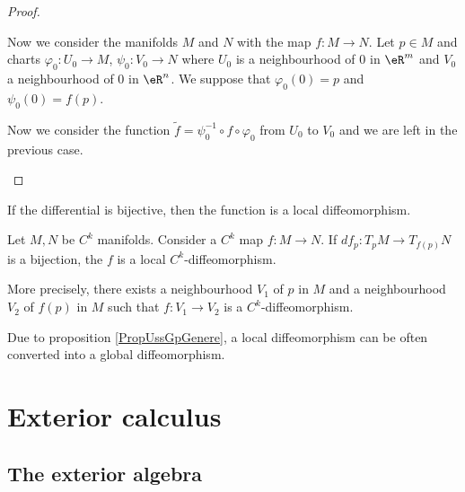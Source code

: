 \begin{proof}
\begin{subproof}

            Now we consider the manifolds \( M\) and \( N\) with the map \( f\colon M\to N\). Let \( p\in M\) and charts \( \varphi_0\colon U_0\to M\), \( \psi_0\colon V_0\to N\) where \( U_0\) is a neighbourhood of \( 0\) in \( \eR^m\) and \( V_0\) a neighbourhood of \( 0\) in \( \eR^n\). We suppose that \( \varphi_0(0)=p\) and \( \psi_0(0)=f(p)\).

            Now we consider the function \( \tilde f=\psi_0^{-1}\circ f\circ \varphi_0\) from \( U_0\) to \( V_0\) and we are left in the previous case.
    \end{subproof}
\end{proof}

If the differential is bijective, then the function is a local diffeomorphism.
\begin{theorem}       \label{THOooDWEXooMClWVi}
    Let \( M,N\) be \( C^k\) manifolds. Consider a \( C^k\) map \( f\colon M\to N\). If \( df_p\colon T_pM\to T_{f(p)}N\) is a bijection, the \( f\) is a local \( C^k\)-diffeomorphism.

    More precisely, there exists a neighbourhood \( V_1\) of \( p\) in \( M\) and a neighbourhood \( V_2\) of \( f(p)\) in \( M\) such that \( f\colon V_1\to V_2\) is a \( C^k\)-diffeomorphism.
\end{theorem}

Due to proposition \ref{PropUssGpGenere}, a local diffeomorphism can be often converted into a global diffeomorphism.

\section{Exterior calculus}

\subsection{The exterior algebra}


